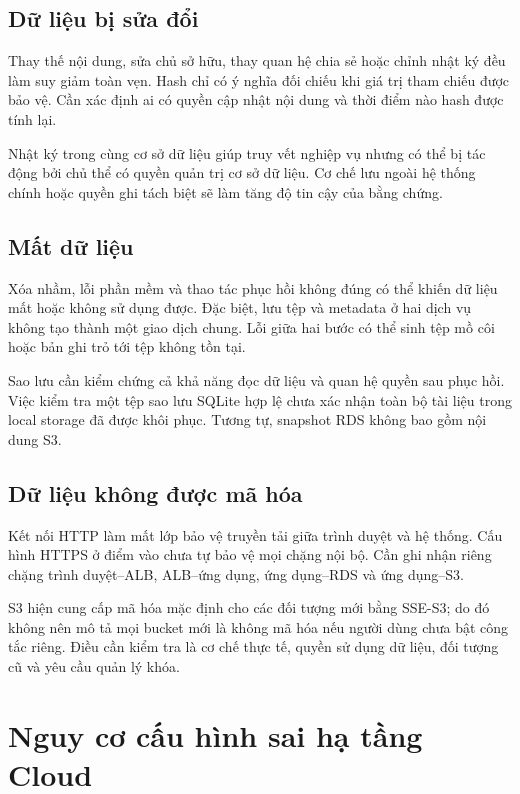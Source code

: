 \subsection{Dữ liệu bị sửa đổi}
Thay thế nội dung, sửa chủ sở hữu, thay quan hệ chia sẻ hoặc chỉnh nhật ký đều làm suy giảm toàn vẹn. Hash chỉ có ý nghĩa đối chiếu khi giá trị tham chiếu được bảo vệ. Cần xác định ai có quyền cập nhật nội dung và thời điểm nào hash được tính lại.

Nhật ký trong cùng cơ sở dữ liệu giúp truy vết nghiệp vụ nhưng có thể bị tác động bởi chủ thể có quyền quản trị cơ sở dữ liệu. Cơ chế lưu ngoài hệ thống chính hoặc quyền ghi tách biệt sẽ làm tăng độ tin cậy của bằng chứng.
\subsection{Mất dữ liệu}
Xóa nhầm, lỗi phần mềm và thao tác phục hồi không đúng có thể khiến dữ liệu mất hoặc không sử dụng được. Đặc biệt, lưu tệp và metadata ở hai dịch vụ không tạo thành một giao dịch chung. Lỗi giữa hai bước có thể sinh tệp mồ côi hoặc bản ghi trỏ tới tệp không tồn tại.

Sao lưu cần kiểm chứng cả khả năng đọc dữ liệu và quan hệ quyền sau phục hồi. Việc kiểm tra một tệp sao lưu SQLite hợp lệ chưa xác nhận toàn bộ tài liệu trong local storage đã được khôi phục. Tương tự, snapshot RDS không bao gồm nội dung S3.
\subsection{Dữ liệu không được mã hóa}
Kết nối HTTP làm mất lớp bảo vệ truyền tải giữa trình duyệt và hệ thống. Cấu hình HTTPS ở điểm vào chưa tự bảo vệ mọi chặng nội bộ. Cần ghi nhận riêng chặng trình duyệt--ALB, ALB--ứng dụng, ứng dụng--RDS và ứng dụng--S3.

S3 hiện cung cấp mã hóa mặc định cho các đối tượng mới bằng SSE-S3; do đó không nên mô tả mọi bucket mới là không mã hóa nếu người dùng chưa bật công tắc riêng. Điều cần kiểm tra là cơ chế thực tế, quyền sử dụng dữ liệu, đối tượng cũ và yêu cầu quản lý khóa.\cite{sses3}

\section{Nguy cơ cấu hình sai hạ tầng Cloud}
